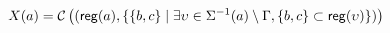 \begin{equation}
X(a) = \mathcal C\left( (\mathsf{reg}({a}), \{ \{b,c\} \mid
				\exists \upsilon\in \Sigma^{-1}(a) \setminus \Gamma,
					\{b,c\} \subset \mathsf{reg}({\upsilon}) \}) \right)
\label{eq:influence-groups}
\end{equation}

\begin{comment}
a global overview of the evolution of each level
of $a$ w.r.t. a configuration $\sigma\in\configs a$.
The evolution of $a_i$ in the context $\ctx(\sigma\{a_i\})$ is given by the function
$\epsilon(a_i,\sigma)$ (\pref{eq:epsilon}) which returns $\varnothing$ if there is no action
possible, $+$ (resp. $-$) if all actions makes $a_i$ bounce to a higher (resp. lower) level,
and $\pm$ if both evolutions are possible.
\begin{equation}
\epsilon(a_i, \sigma) \DEF
\begin{cases}
\varnothing & \text{if }\focals(a,\{a_i\},\ctx(\sigma\{a_i\}))=\{ a_i \} \\
+ &  \text{if }\focals(a, \{a_i\},\ctx(\sigma\{a_i\})) = \{ a_{i+1} \}\\
- &  \text{if }\focals(a, \{a_i\},\ctx(\sigma\{a_i\})) = \{ a_{i-1} \}\\
\pm & \text{otherwise.}
\end{cases}
\label{eq:epsilon}
\end{equation}
We infer the self-influence of $a$ by checking one of the following three cases.
First, if there exists $a_i,a_j\in L_a, i <j$ such that $\epsilon(a_i,\sigma)$ and
$\epsilon(a_j,\sigma)$ are of opposite sign, then $a$ has a self-influence of the sign of the latter
$\epsilon$ (with a maximum threshold $k=j$).
Second, we look at the evolution at the limit levels of $a$:
if $\epsilon(a_0,\sigma)=\bar s$ or $\epsilon(a_{l_a},\sigma)=s$, we infer an influence of sign $s$
with a threshold $k=l_a$.
We note that this case can only apply for negative interactions (as $\epsilon(a_0,\sigma)$ (resp.
$\epsilon(a_{l_a},\sigma)$ can never be negative (resp. positive)).
Third, if $\forall a_i\in L_a$, $\epsilon(a_i,\sigma)$ is either $\varnothing$ or of sign $s$, we
ensure there exists $a_j\in L_a$ such that $\epsilon(a_j,\sigma)=s$ and we infer a self-influence of
sign $s$ and threshold $k=j$.
\end{comment}


